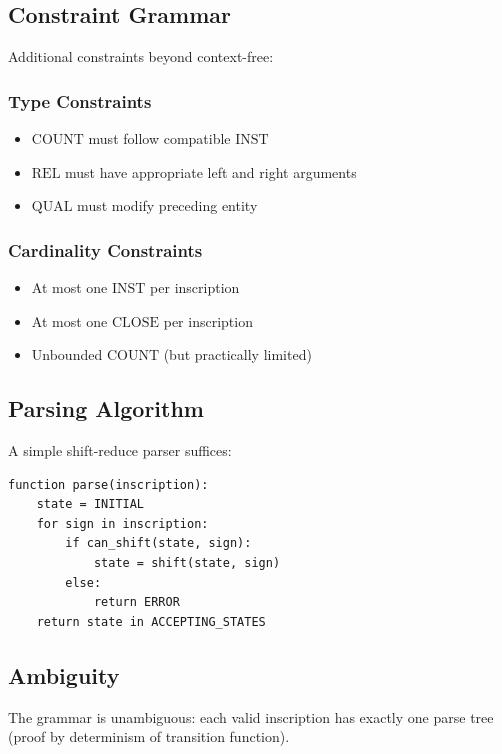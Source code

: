\subsection{Constraint Grammar}

Additional constraints beyond context-free:

\subsubsection{Type Constraints}
\begin{itemize}
    \item $\text{COUNT}$ must follow compatible $\text{INST}$
    \item $\text{REL}$ must have appropriate left and right arguments
    \item $\text{QUAL}$ must modify preceding entity
\end{itemize}

\subsubsection{Cardinality Constraints}
\begin{itemize}
    \item At most one $\text{INST}$ per inscription
    \item At most one $\text{CLOSE}$ per inscription
    \item Unbounded $\text{COUNT}$ (but practically limited)
\end{itemize}

\subsection{Parsing Algorithm}

A simple shift-reduce parser suffices:

\begin{verbatim}
function parse(inscription):
    state = INITIAL
    for sign in inscription:
        if can_shift(state, sign):
            state = shift(state, sign)
        else:
            return ERROR
    return state in ACCEPTING_STATES
\end{verbatim}

\subsection{Ambiguity}

The grammar is unambiguous: each valid inscription has exactly one parse tree (proof by determinism of transition function).

